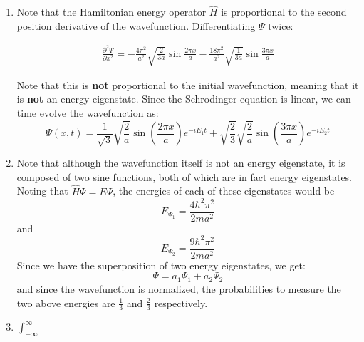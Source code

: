 \begin{sol}
\begin{enumerate}[label=\textbf{(\alph*)}]
    \item Note that the Hamiltonian energy operator $\hat{H}$ is proportional to the second position derivative of the wavefunction. Differentiating $\Psi$ twice:
    
    \begin{align*}
        \frac{\partial^2\Psi}{\partial x^2} = -\frac{4\pi^2}{a^2}\sqrt{\frac{2}{3a}}\sin{\frac{2\pi x}{a}} - \frac{18\pi^2}{a^2}\sqrt{\frac{1}{3a}}\sin{\frac{3\pi x}{a}}
    \end{align*}
    
    Note that this is \textbf{not} proportional to the initial wavefunction, meaning that it is \textbf{not} an energy eigenstate. Since the Schrodinger equation is linear, we can time evolve the wavefunction as:
    $$\Psi(x,t)=\frac{1}{\sqrt 3}\sqrt{\frac{2}{a}}\sin\left(\frac{2\pi x}{a}\right)e^{-i E_1t}+\sqrt{\frac{2}{3}}\sqrt{\frac{2}{a}}\sin\left(\frac{3\pi x}{a}\right)e^{-i E_2t}$$
    
    \item Note that although the wavefunction itself is not an energy eigenstate, it is composed of two sine functions, both of which are in fact energy eigenstates. Noting that $\hat{H}\Psi = E\Psi$, the energies of each of these eigenstates would be $$E_{\Psi_1}=\frac{4\hbar^2\pi^2}{2ma^2}$$ and $$E_{\Psi_2}=\frac{9\hbar^2\pi^2}{2ma^2}$$ Since we have the superposition of two energy eigenstates, we get:
    $$\Psi = a_1 \Psi_1 + a_2 \Psi_2$$
    and since the wavefunction is normalized, the probabilities to measure the two above energies are $\frac{1}{3}$ and $\frac{2}{3}$ respectively.
    
    \item $\int_{-\infty}^{\infty}$
\end{enumerate}
\end{sol}
